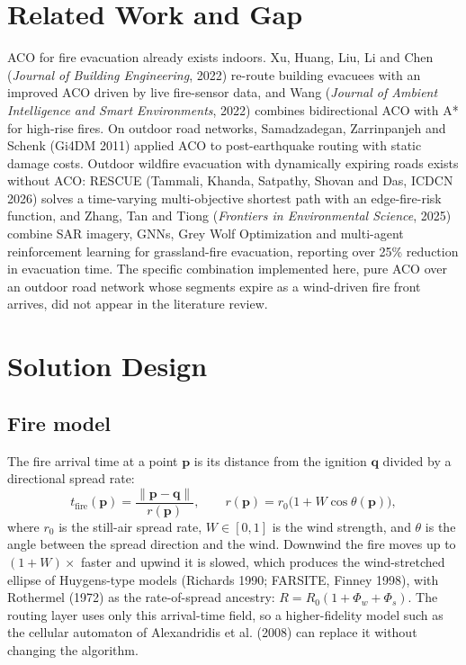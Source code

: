 \documentclass[11pt,a4paper]{article}
\begin{document}
\section{Related Work and Gap}

ACO for fire evacuation already exists indoors. Xu, Huang, Liu, Li and Chen (\emph{Journal of Building Engineering}, 2022) re-route building evacuees with an improved ACO driven by live fire-sensor data, and Wang (\emph{Journal of Ambient Intelligence and Smart Environments}, 2022) combines bidirectional ACO with A* for high-rise fires. On outdoor road networks, Samadzadegan, Zarrinpanjeh and Schenk (Gi4DM 2011) applied ACO to post-earthquake routing with static damage costs. Outdoor wildfire evacuation with dynamically expiring roads exists without ACO: RESCUE (Tammali, Khanda, Satpathy, Shovan and Das, ICDCN 2026) solves a time-varying multi-objective shortest path with an edge-fire-risk function, and Zhang, Tan and Tiong (\emph{Frontiers in Environmental Science}, 2025) combine SAR imagery, GNNs, Grey Wolf Optimization and multi-agent reinforcement learning for grassland-fire evacuation, reporting over 25\% reduction in evacuation time. The specific combination implemented here, pure ACO over an outdoor road network whose segments expire as a wind-driven fire front arrives, did not appear in the literature review. 

\section{Solution Design}

\subsection{Fire model}
The fire arrival time at a point $\mathbf{p}$ is its distance from the ignition $\mathbf{q}$ divided by a directional spread rate:
\begin{equation}
t_{\text{fire}}(\mathbf{p}) = \frac{\|\mathbf{p}-\mathbf{q}\|}{r(\mathbf{p})},
\qquad
r(\mathbf{p}) = r_0 \Big(1 + W \cos\theta(\mathbf{p})\Big),
\end{equation}
where $r_0$ is the still-air spread rate, $W \in [0,1]$ is the wind strength, and $\theta$ is the angle between the spread direction and the wind. Downwind the fire moves up to $(1+W)\times$ faster and upwind it is slowed, which produces the wind-stretched ellipse of Huygens-type models (Richards 1990; FARSITE, Finney 1998), with Rothermel (1972) as the rate-of-spread ancestry: $R = R_0 (1 + \Phi_w + \Phi_s)$. The routing layer uses only this arrival-time field, so a higher-fidelity model such as the cellular automaton of Alexandridis et al. (2008) can replace it without changing the algorithm.
\end{document}
